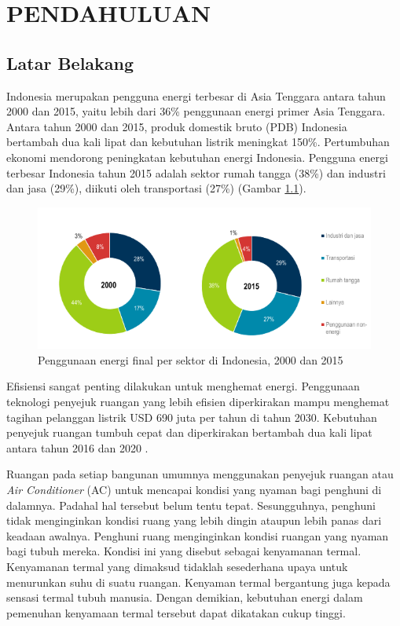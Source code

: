 \chapter{PENDAHULUAN}\label{pendahuluan}
\section{Latar Belakang}\label{latar belakang}

Indonesia merupakan pengguna energi terbesar di Asia Tenggara antara tahun 2000 dan 2015, yaitu lebih dari 36\% penggunaan energi primer Asia Tenggara. Antara tahun 2000 dan 2015, produk domestik bruto (PDB) Indonesia bertambah dua kali lipat dan kebutuhan listrik meningkat 150\%. Pertumbuhan ekonomi mendorong peningkatan kebutuhan energi Indonesia. Pengguna energi terbesar Indonesia tahun
2015 adalah sektor rumah tangga (38\%) dan industri dan jasa (29\%), diikuti oleh transportasi (27\%) (Gambar \ref{fig:1:energy}).
\begin{figure}[!h]
	\centering
	\includegraphics[width=1\textwidth]{figures/EnergyUsage}
	\caption{Penggunaan energi final per sektor di Indonesia, 2000 dan 2015 \cite{IEA}}
	\label{fig:1:energy}
\end{figure}
Efisiensi sangat penting dilakukan untuk menghemat energi. Penggunaan teknologi penyejuk ruangan yang lebih efisien diperkirakan mampu
menghemat tagihan pelanggan listrik USD 690 juta per tahun di tahun 2030. Kebutuhan
penyejuk ruangan tumbuh cepat dan diperkirakan bertambah dua kali lipat antara tahun
2016 dan 2020 \cite{IEA}.

Ruangan pada setiap bangunan umumnya menggunakan penyejuk ruangan atau \textit{Air Conditioner} (AC) untuk mencapai kondisi yang nyaman bagi penghuni di dalamnya. Padahal hal tersebut belum tentu tepat. Sesungguhnya, penghuni tidak menginginkan kondisi ruang yang lebih dingin ataupun lebih panas dari keadaan awalnya. Penghuni ruang menginginkan kondisi ruangan yang nyaman bagi tubuh mereka. Kondisi ini yang disebut sebagai kenyamanan termal. Kenyamanan termal yang dimaksud tidaklah sesederhana upaya untuk menurunkan suhu di suatu ruangan. Kenyaman termal bergantung juga kepada sensasi termal tubuh manusia. Dengan demikian, kebutuhan energi dalam pemenuhan kenyamaan termal tersebut dapat dikatakan cukup tinggi.

